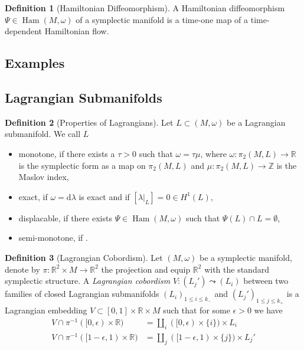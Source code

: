 \documentclass[a4paper]{article}
\newcommand{\RR}{\mathbb{R}}
\newcommand{\ZZ}{\mathbb{Z}}
\newcommand{\dd}{\mathrm{d}}
\newcommand{\lra}{\longrightarrow}
\theoremstyle{definition}
\theoremstyle{definition}
\newtheorem{definition}{Definition}
\theoremstyle{remark}
\theoremstyle{remark}
\theoremstyle{remark}
\begin{document}
\begin{definition}[Hamiltonian Diffeomorphism]
  A Hamiltonian diffeomorphism $\Psi\in\operatorname{Ham}(M,\omega)$ of a symplectic manifold is a time-one map of a time-dependent Hamiltonian flow.
\end{definition}

\subsection{Examples}

\subsection{Lagrangian Submanifolds}

\begin{definition}[Properties of Lagrangians]
Let $L\subset (M,\omega)$ be a Lagrangian submanifold. We call $L$
\begin{itemize}
  \item monotone, if there exists a $\tau>0$ such that $\omega=\tau\mu$, where $\omega:\pi_2(M,L)\lra\RR$ is the symplectic form as a map on $\pi_2(M,L)$ and $\mu:\pi_2(M,L)\lra\ZZ$ is the Maslov index,
  \item exact, if $\omega=\dd\lambda$ is exact and if $[\lambda|_L]=0\in H^1(L)$,
  \item displacable, if there exists $\Psi\in\operatorname{Ham}(M,\omega)$ such that $\Psi(L)\cap L=\emptyset$,
  \item semi-monotone, if .
\end{itemize}
\end{definition}

\begin{definition}[Lagrangian Cobordism]
  Let $(M,\omega)$ be a symplectic manifold, denote by $\pi:\RR^2\times M\lra\RR^2$ the projection and equip $\RR^2$ with the standard symplectic structure. A \emph{Lagrangian cobordism} $V:(L_j')\leadsto(L_i)$ between two families of closed Lagrangian submanifolds $(L_i)_{1\leq i\leq k_-}$ and $(L_j')_{1\leq j\leq k_+}$  is a Lagrangian embedding $V\subset [0,1]\times\RR\times M$ such that for some $\epsilon>0$ we have
  \begin{align*}
    V\cap\pi^{-1}([0,\epsilon)\times \RR)&=\coprod_i([0,\epsilon)\times\{i\})\times L_i \\
    V\cap\pi^{-1}([1-\epsilon,1)\times \RR)&=\coprod_j([1-\epsilon,1)\times\{j\})\times L_j'
  \end{align*}
\end{definition}
\end{document}
